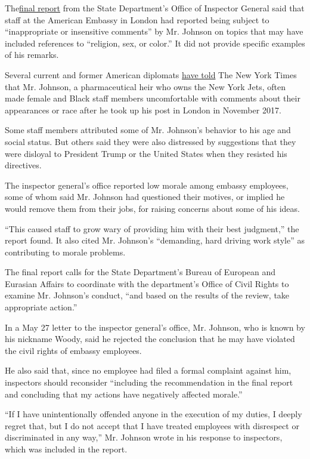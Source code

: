 The\href{https://www.stateoig.gov/system/files/isp-i-20-12.pdf}{final
report} from the State Department's Office of Inspector General said
that staff at the American Embassy in London had reported being subject
to ``inappropriate or insensitive comments'' by Mr. Johnson on topics
that may have included references to ``religion, sex, or color.'' It did
not provide specific examples of his remarks.

Several current and former American diplomats
\href{https://www.nytimes3xbfgragh.onion/2020/07/24/world/europe/woody-johnson-trump.html}{have
told} The New York Times that Mr. Johnson, a pharmaceutical heir who
owns the New York Jets, often made female and Black staff members
uncomfortable with comments about their appearances or race after he
took up his post in London in November 2017.

Some staff members attributed some of Mr. Johnson's behavior to his age
and social status. But others said they were also distressed by
suggestions that they were disloyal to President Trump or the United
States when they resisted his directives.

The inspector general's office reported low morale among embassy
employees, some of whom said Mr. Johnson had questioned their motives,
or implied he would remove them from their jobs, for raising concerns
about some of his ideas.

``This caused staff to grow wary of providing him with their best
judgment,'' the report found. It also cited Mr. Johnson's ``demanding,
hard driving work style'' as contributing to morale problems.

The final report calls for the State Department's Bureau of European and
Eurasian Affairs to coordinate with the department's Office of Civil
Rights to examine Mr. Johnson's conduct, ``and based on the results of
the review, take appropriate action.''

In a May 27 letter to the inspector general's office, Mr. Johnson, who
is known by his nickname Woody, said he rejected the conclusion that he
may have violated the civil rights of embassy employees.

He also said that, since no employee had filed a formal complaint
against him, inspectors should reconsider ``including the recommendation
in the final report and concluding that my actions have negatively
affected morale.''

``If I have unintentionally offended anyone in the execution of my
duties, I deeply regret that, but I do not accept that I have treated
employees with disrespect or discriminated in any way,'' Mr. Johnson
wrote in his response to inspectors, which was included in the report.

